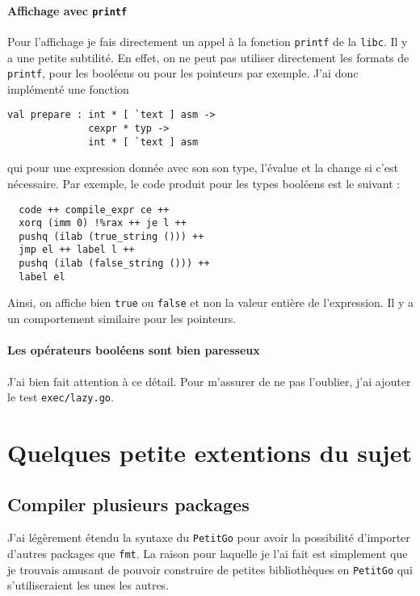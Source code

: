 \documentclass{article}
\begin{document}
\paragraph{Affichage avec \texttt{printf}}

Pour l'affichage je fais directement un appel à la fonction \texttt{printf} de la \texttt{libc}. Il y a une petite subtilité. En effet, on ne peut pas utiliser directement les formats de \texttt{printf}, pour les booléens ou pour les pointeurs par exemple. J'ai donc implémenté une fonction

\begin{verbatim}
val prepare : int * [ `text ] asm ->
              cexpr * typ ->
              int * [ `text ] asm
\end{verbatim}

qui pour une expression donnée avec son son type, l'évalue et la change si c'est nécessaire. Par exemple, le code produit pour les types booléens est le suivant :

\begin{verbatim}
  code ++ compile_expr ce ++
  xorq (imm 0) !%rax ++ je l ++
  pushq (ilab (true_string ())) ++
  jmp el ++ label l ++
  pushq (ilab (false_string ())) ++
  label el
\end{verbatim}

Ainsi, on affiche bien \texttt{true} ou \texttt{false} et non la valeur entière de l'expression. Il y a un comportement similaire pour les pointeurs.

\paragraph{Les opérateurs booléens sont bien paresseux} J'ai bien fait attention à ce détail. Pour m'assurer de ne pas l'oublier, j'ai ajouter le test \texttt{exec/lazy.go}.

\section{Quelques petite extentions du sujet\label{sec:ext}}

\subsection{Compiler plusieurs packages\label{sec:pkg}}

J'ai légèrement étendu la syntaxe du \texttt{PetitGo} pour avoir la possibilité d'importer d'autres packages que \texttt{fmt}. La raison pour laquelle je l'ai fait est simplement que je trouvais amusant de pouvoir construire de petites bibliothèques en \texttt{PetitGo} qui s'utiliseraient les unes les autres.
\end{document}
